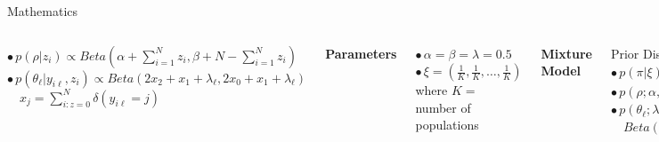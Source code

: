 \documentclass[letter,graphicx]{beamer}
\begin{document}
\begin{frame}{Mathematics}
\begin{tiny}
\begin{columns}[T]
$\bullet \, p(\rho|z_i) \propto Beta(\alpha + \sum_{i=1}^{N} z_i, \beta + N - \sum_{i=1}^{N} z_i)$ \\ \vspace{1mm}
$\bullet \,p(\theta_{\ell}|y_{i\ell},z_i) \propto Beta(2x_2 + x_1 + \lambda_{\ell}, 2x_0 + x_1 + \lambda_{\ell})$ \\ \vspace{1mm}
$\quad x_j = \sum_{i:z=0}^{N} \delta(y_{i\ell} = j)$\\

\vspace{3mm}
\centerline{\textbf{Parameters}}
\vspace{2mm}
$\bullet \, \alpha = \beta = \lambda = 0.5$ \\
\vspace{1mm}
$\bullet \, \xi = (\frac{1}{K}, \frac{1}{K}, \ldots, \frac{1}{K})$ where $K = $ number of populations
\vspace{3mm}



\column{2.5in}
\centerline{\textbf{Mixture Model}}
\vspace{2mm}
Prior Distributions \\ \vspace{1mm}
$\bullet \, p(\pi|\xi) \propto \prod_{i = 1}^K \pi_{i}^{\xi_i - 1} = Dirichlet(\xi_1, \ldots, \xi_K)$ \\
\vspace{1mm}
$\bullet \, p(\rho;\alpha,\beta) \propto \rho^{\alpha - 1}(1 - \rho)^{\beta - 1} = Beta(\alpha, \beta)$
$\bullet \, p(\theta_{\ell};\lambda_{\ell}) \propto \theta_{\ell}^{x_i + \lambda_{\ell}-1}(1 - \theta_{\ell})^{x_0 + \lambda_{\ell}-1} = $ \\ 
\vspace{1mm}
$\quad Beta(x_1 + \lambda_{\ell},x_0 + \lambda_{\ell})$ \\ 
\vspace{2mm}


\end{columns}
\end{tiny}
\end{frame}
\end{document}
